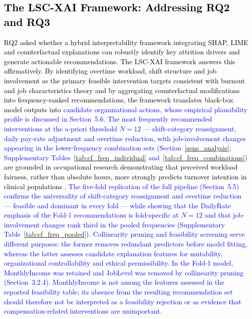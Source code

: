 \documentclass[a4paper,fleqn]{cas-sc}
\begin{document}
\subsection{\textcolor{black}{The LSC-XAI Framework: Addressing RQ2 and RQ3}}
\textcolor{black}{RQ2 asked whether a hybrid interpretability framework integrating SHAP, LIME and counterfactual explanations can robustly identify key attrition drivers and generate actionable recommendations. The LSC-XAI framework answers this affirmatively. By identifying overtime workload, shift structure and job involvement as the primary feasible intervention targets consistent with burnout and job characteristics theory \cite{hackman1976motivation} and by aggregating counterfactual modifications into frequency-ranked recommendations, the framework translates black-box model outputs into \textcolor{blue}{candidate organizational actions, whose empirical plausibility profile is discussed in Section~5.6}. \textcolor{blue}{The most frequently recommended interventions at the a-priori threshold $N = 12$ --- shift-category reassignment, daily pay-rate adjustment and overtime reduction, with job-involvement changes appearing in the lower-frequency combination sets (Section~\ref{sens_analysis}; Supplementary Tables~\ref{tab:cf_freq_individual} and~\ref{tab:cf_freq_combinations})} are grounded in occupational research demonstrating that perceived workload fairness, rather than absolute hours, more strongly predicts turnover intention in clinical populations \cite{LavoieTremblay2010}. \textcolor{blue}{The five-fold replication of the full pipeline (Section~5.5) confirms the universality of shift-category reassignment and overtime reduction --- feasible and dominant in every fold --- while showing that the DailyRate emphasis of the Fold-1 recommendations is fold-specific at $N = 12$ and that job-involvement changes rank third in the pooled frequencies (Supplementary Table~\ref{tab:cf_freq_pooled}).} \textcolor{blue}{Collinearity pruning and feasibility screening serve different purposes: the former removes redundant predictors before model fitting, whereas the latter assesses candidate explanation features for mutability, organizational controllability and ethical permissibility. In the Fold-1 model, MonthlyIncome was retained and JobLevel was removed by collinearity pruning (Section~3.2.4). MonthlyIncome is not among the features assessed in the reported feasibility table; its absence from the resulting recommendation set should therefore not be interpreted as a feasibility rejection or as evidence that compensation-related interventions are unimportant.}}
\end{document}
